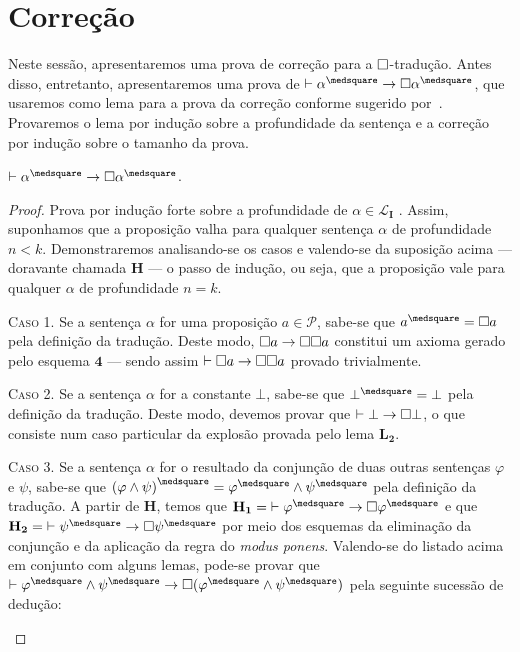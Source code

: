 \section{Correção}

    Neste sessão, apresentaremos uma prova de correção para a $\Box$-tradução. Antes disso, entretanto, apresentaremos uma prova de $\entails\alpha^\medsquare\to\nec\alpha^\medsquare$, que usaremos como lema para a prova da correção conforme sugerido por~\cite{Troelstra}. Provaremos o lema por indução sobre a profundidade da sentença e a correção por indução sobre o tamanho da prova.

    \begin{lemma}\label{square-nec}
        $\entails\alpha^\medsquare\to\nec\alpha^\medsquare$.

        \begin{proof}
            Prova por indução forte sobre a profundidade de $\alpha\in\mathcal{L}_\mathbf{I}$ \citep{Troelstra}.
            Assim, suponhamos que a proposição valha para qualquer sentença $\alpha$ de profundidade $n<k$.
            Demonstraremos analisando-se os casos e valendo-se da suposição acima --- doravante chamada $\mathbf{H}$ --- o passo de indução, ou seja, que a proposição vale para qualquer $\alpha$ de profundidade $n=k$.

            \begin{case}
                \textsc{Caso 1.}
                Se a sentença $\alpha$ for uma proposição $a\in\mathcal{P}$, sabe-se que $a^\medsquare=\nec a$ pela definição da tradução.
                Deste modo, $\Box{a}\to\Box\Box{a}$ constitui um axioma gerado pelo esquema \hyperref[MB3]{$\mathbf{4}$} --- sendo assim $\mathrel{\vdash}\Box{a}\to\Box\Box{a}$ provado trivialmente.
            \end{case}

            \begin{case}
                \textsc{Caso 2.}
                Se a sentença $\alpha$ for a constante $\bot$, sabe-se que $\bot^\medsquare=\bot$ pela definição da tradução.
                Deste modo, devemos provar que $\mathrel{\vdash}\bot\to\Box\bot$, o que consiste num caso particular da explosão provada pelo lema \hyperref[explosion]{$\mathbf{L_2}$}.
            \end{case}

            \begin{case}
                \textsc{Caso 3.}
                Se a sentença $\alpha$ for o resultado da conjunção de duas outras sentenças $\varphi$ e $\psi$, sabe-se que ${(\varphi\wedge\psi)}^\medsquare=\varphi^\medsquare\wedge\psi^\medsquare$ pela definição da tradução.
                A partir de $\mathbf{H}$, temos que $\mathbf{H_1}={\entails\varphi^\medsquare\to\nec\varphi^\medsquare}$ e que $\mathbf{H_2}={\entails\psi^\medsquare\to\nec\psi^\medsquare}$ por meio dos esquemas da eliminação da conjunção e da aplicação da regra do \emph{modus ponens}.
                Valendo-se do listado acima em conjunto com alguns lemas, pode-se provar que $\entails\varphi^\medsquare\wedge\psi^\medsquare\to\nec(\varphi^\medsquare\wedge\psi^\medsquare)$ pela seguinte sucessão de dedução:


\end{case}
\end{proof}
\end{lemma}
